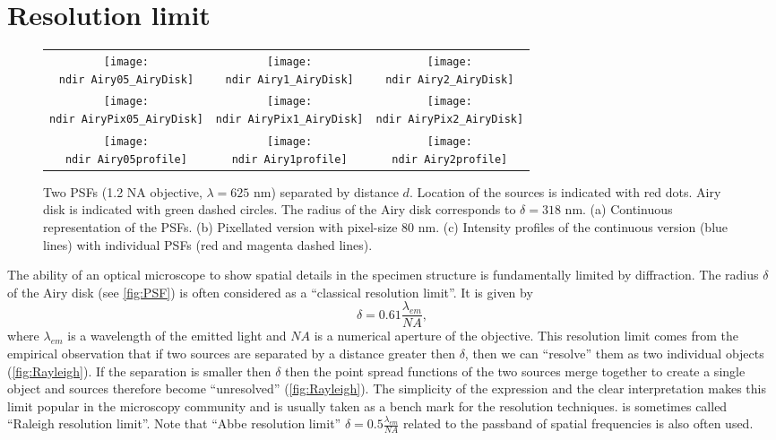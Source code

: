 
\section{Resolution limit \label{sec:Resolution limit}}

\begin{figure}[!bht]
	\centering
	\newcommand{\wf}{.3\textwidth}	
	\newcommand{\ndir}{figures/psfillustration/}
	\begin{tabular}{ccc}
		\subfloat[$d=\delta/2$]{\texttt{[image: \\ndir Airy05\_AiryDisk]}}
		& \subfloat[$d=\delta$]{\texttt{[image: \\ndir Airy1\_AiryDisk]}}
		& \subfloat[$d=2\delta$]{\texttt{[image: \\ndir Airy2\_AiryDisk]}}
		\tabularnewline
		\subfloat[$d=\delta/2$]{\texttt{[image: \\ndir AiryPix05\_AiryDisk]}}
		& \subfloat[$d=\delta$]{\texttt{[image: \\ndir AiryPix1\_AiryDisk]}}
		& \subfloat[$d=2\delta$]{\texttt{[image: \\ndir AiryPix2\_AiryDisk]}}
		\tabularnewline
		\subfloat[$d=\delta/2$]{\texttt{[image: \\ndir Airy05profile]}}
		& \subfloat[$d=\delta$]{\texttt{[image: \\ndir Airy1profile]}}
		& \subfloat[$d=2\delta$]{\texttt{[image: \\ndir Airy2profile]}}
		\tabularnewline
	\end{tabular}
	\caption{Two PSFs (1.2 NA objective, $\lambda=625$ nm) separated by distance $d$. Location of the sources is indicated with red dots. Airy disk is indicated with green dashed circles. The radius of the Airy disk corresponds to $\delta=318$ nm. (a) Continuous representation of the PSFs. (b) Pixellated version with pixel-size 80 nm. (c) Intensity profiles of the continuous version (blue lines) with individual PSFs (red and magenta dashed lines).}
	\label{fig:Rayleigh}
\end{figure}
%
The ability of an optical microscope to show spatial details in the specimen structure is fundamentally limited by diffraction. The radius $\delta$ of the Airy disk (see \autoref{fig:PSF}) is often considered as a ``classical resolution limit''. It is given by
%
\begin{equation}
 	\delta=0.61\frac{\lambda_{em}}{NA}, 
	\label{eq:Airy}
\end{equation}
%
where $\lambda_{em}$ is a wavelength of the emitted light and $NA$ is a numerical aperture of the objective. This resolution limit comes from the empirical observation that if two sources are separated by a distance greater then $\delta$, then we can ``resolve'' them as two individual objects (\autoref{fig:Rayleigh}\ccc). If the separation is smaller then $\delta$ then the point spread functions of the two sources merge together to create a single object and sources therefore become ``unresolved'' (\autoref{fig:Rayleigh}\aaa). The simplicity of the expression and the clear interpretation makes this limit popular in the microscopy community and is usually taken as a bench mark for the resolution techniques.  is sometimes called ``Raleigh resolution limit''. Note that ``Abbe resolution limit'' $\delta=0.5\frac{\lambda_{em}}{NA}$ related to the passband of spatial frequencies is also often used.

